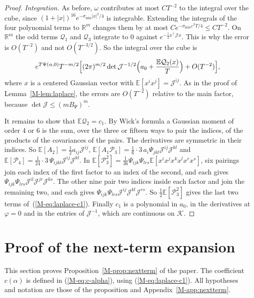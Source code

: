 \documentclass[EJP,preprint]{ejpecp}
\newcommand{\mref}[1]{\ref*{M-#1}}
\newcommand{\meqref}[1]{(\mref{#1})}
\newcommand{\R}{\mathbb{R}}
\newcommand{\E}{\mathbb{E}}
\begin{document}
\begin{proof}
\emph{Integration.} As before, $\omega$ contributes at most $CT^{-2}$ to the
integral over the cube, since $(1+|x|)^{16}e^{-\sigma_{\min}|x|^2/4}$ is
integrable. Extending the integrals of the four polynomial terms to $\R^m$
changes them by at most $Ce^{-\sigma_{\min}\varepsilon^2T/4}\le CT^{-2}$. On $\R^m$
the odd terms $\mathcal Q_1$ and $\mathcal Q_3$ integrate to $0$ against
$e^{-\frac12x^\top\mathcal Jx}$. This is why the error is $O(T^{-2})$ and not
$O(T^{-3/2})$. So the integral over the cube is
\[
e^{T\Psi(\alpha,0)}T^{-m/2}\Bigl[(2\pi)^{m/2}\det\mathcal J^{-1/2}
\Bigl(a_0+\frac{\E\mathcal Q_2(x)}T\Bigr)+O(T^{-2})\Bigr],
\]
where $x$ is a centered Gaussian vector with $\E[x^ix^j]=\mathcal J^{ij}$. As
in the proof of Lemma~\mref{lem:laplace}, the errors are $O(T^{-2})$ relative
to the main factor, because $\det\mathcal J\le(mB_\Psi)^m$.

It remains to show that $\E\mathcal Q_2=c_1$. By Wick's formula a Gaussian
moment of order $4$ or $6$ is the sum, over the three or fifteen ways to pair the
indices, of the products of the covariances of the pairs. The derivatives are
symmetric in their indices. So $\E[A_2]=\frac12a_{ij}\mathcal J^{ij}$,
$\E[A_1\mathcal P_3]=\frac16\cdot3\,a_i\Psi_{jkl}\mathcal J^{ij}\mathcal J^{kl}$ and
$\E[\mathcal P_4]=\frac1{24}\cdot3\,\Psi_{ijkl}\mathcal J^{ij}\mathcal J^{kl}$. In
$\E[\mathcal P_3^2]=\frac1{36}\Psi_{ijk}\Psi_{lrs}\E[x^ix^jx^kx^lx^rx^s]$, six pairings
join each index of the first factor to an index of the second, and each gives
$\Psi_{ijk}\Psi_{lrs}\mathcal J^{il}\mathcal J^{jr}\mathcal J^{ks}$. The other
nine pair two indices inside each factor and join the remaining two, and each
gives $\Psi_{ijk}\Psi_{lrs}\mathcal J^{ij}\mathcal J^{kl}\mathcal J^{rs}$. So
$\frac12\E[\mathcal P_3^2]$ gives the last two terms of~\meqref{eq:laplace-c1}. Finally
$c_1$ is a polynomial in $a_0$, in the derivatives at $\varphi=0$ and in the
entries of $\mathcal J^{-1}$, which are continuous on $\mathcal K$.
\end{proof}

\section{Proof of the next-term expansion}\label{supp:nextterm}

This section proves Proposition~\mref{prop:nextterm} of the paper. The coefficient
$c(\alpha)$ is defined in \meqref{eq:c-alpha}, using \meqref{eq:laplace-c1}.
All hypotheses and notation are those of the proposition and Appendix~\mref{app:nextterm}.
\end{document}
